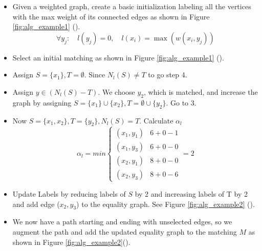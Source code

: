 \documentclass[twoside]{article}
\begin{document}
\begin{itemize}
\item Given a weighted graph, create a basic initialization labeling all the vertices with the max weight of its connected edges as shown in Figure \protect \ref{fig:alg_example1} ().
$$ \forall y_{j}: \quad l(y_{j}) = 0, \quad l(x_{i}) = \max(w(x_{i}, y_{j})) $$
\item Select an initial matching as shown in Figure \protect \ref{fig:alg_example1} ().
\item Assign $S=\{x_{1}\}, T=\emptyset$. Since $N_{l}(S) \not= T$ to go step 4.
\item Assign $y \in (N_{l}(S) - T)$. We choose $y_{2}$, which is matched, and increase the graph by assigning $S = \{x_{1}\} \cup \{x_{2}\}, T = \emptyset \cup \{y_{2}\}$. Go to 3.
\item Now $S=\{x_{1}, x_{2}\}, T = \{y_{2}\}, N_{l}(S) = T$. Calculate $\alpha_{l}$%
\[ \alpha_{l} = min\left\{
\begin{array}{ll}
      (x_{1}, y_{1}) & 6 + 0 -1 \\
      (x_{1}, y_{3}) & 6 + 0 -0 \\
      (x_{2}, y_{1}) & 8 + 0 -0 \\
      (x_{2}, y_{3}) & 8 + 0 -6
\end{array} 
\right. = 2 \]
\item Update Labels by reducing labels of $S$ by 2 and increasing labels of T by 2 and add edge ($x_{2}, y_{3}$) to the equality graph. See Figure \ref{fig:alg_example2} ().
\item We now have a path starting and ending with unselected edges, so we augment the path and add the updated equality graph to the matching $M$ as shown in Figure \ref{fig:alg_example2}().
\end{itemize}
\end{document}
